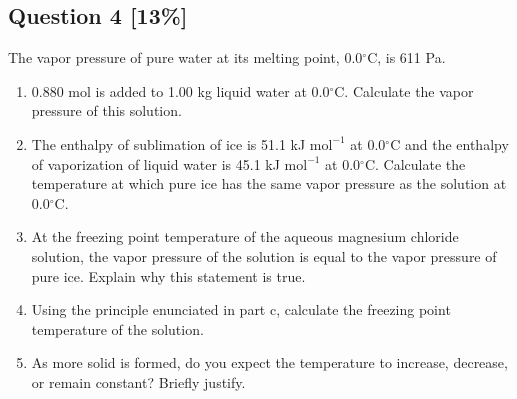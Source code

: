 \documentclass{article}
\begin{document}
\newpage

\subsection*{Question 4 [13\%]}
The vapor pressure of pure water at its melting point, 0.0$^\circ$C, is 611 Pa.
\begin{enumerate}[label=\alph*.]
    \item 0.880 mol  is added to 1.00 kg liquid water at 0.0$^\circ$C. Calculate the vapor pressure of this solution.
    \vspace{3.5cm}
    \item The enthalpy of sublimation of ice is 51.1 kJ $\text{mol}^{-1}$ at 0.0$^\circ$C and the enthalpy of vaporization of liquid water is 45.1 kJ $\text{mol}^{-1}$ at 0.0$^\circ$C. Calculate the temperature at which pure ice has the same vapor pressure as the solution at 0.0$^\circ$C.
    \vspace{3.5cm}
    \item At the freezing point temperature of the aqueous magnesium chloride solution, the vapor pressure of the solution is equal to the vapor pressure of pure ice. Explain why this statement is true.
    \vspace{3.5cm}
    \item Using the principle enunciated in part c, calculate the freezing point temperature of the solution.
    \vspace{3.5cm}
    \item As more solid is formed, do you expect the temperature to increase, decrease, or remain constant? Briefly justify.
    \vspace{3.5cm}
\end{enumerate}

\newpage
\end{document}
